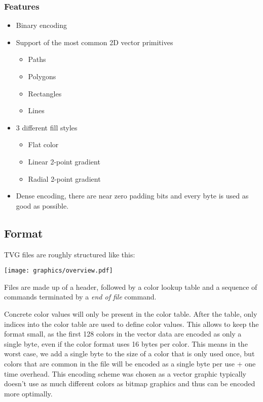 \documentclass[
]{article}
\providecommand{\tightlist}{%
  \setlength{\itemsep}{0pt}\setlength{\parskip}{0pt}}
\begin{document}
\hypertarget{features}{%
\subsubsection{Features}\label{features}}

\begin{itemize}
\tightlist
\item
  Binary encoding
\item
  Support of the most common 2D vector primitives

  \begin{itemize}
  \tightlist
  \item
    Paths
  \item
    Polygons
  \item
    Rectangles
  \item
    Lines
  \end{itemize}
\item
  3 different fill styles

  \begin{itemize}
  \tightlist
  \item
    Flat color
  \item
    Linear 2-point gradient
  \item
    Radial 2-point gradient
  \end{itemize}
\item
  Dense encoding, there are near zero padding bits and every byte is
  used as good as possible.
\end{itemize}

\hypertarget{format}{%
\subsection{Format}\label{format}}

TVG files are roughly structured like this:

\texttt{[image: graphics/overview.pdf]}

Files are made up of a header, followed by a color lookup table and a
sequence of commands terminated by a \emph{end of file} command.

Concrete color values will only be present in the color table. After the
table, only indices into the color table are used to define color
values. This allows to keep the format small, as the first 128 colors in
the vector data are encoded as only a single byte, even if the color
format uses 16 bytes per color. This means in the worst case, we add a
single byte to the size of a color that is only used once, but colors
that are common in the file will be encoded as a single byte per use +
one time overhead. This encoding scheme was chosen as a vector graphic
typically doesn't use as much different colors as bitmap graphics and
thus can be encoded more optimally.
\end{document}
